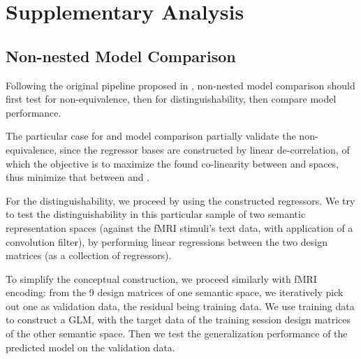 \section{Supplementary Analysis}
\subsection{Non-nested Model Comparison} 
\label{appsubsec:nonnestedcompmeth}
Following the original pipeline proposed in \cite{merkleTestingNonnestedStructural2016}, non-nested model comparison should first test for non-equivalence, then for distinguishability, then compare model performance. 

The particular case for  and  model comparison partially validate the non-equivalence, since the regressor bases are constructed by linear de-correlation, of which the objective is to maximize the found co-linearity between  and  spaces, thus minimize that between  and .

For the distinguishability, we proceed by using the constructed regressors. We try to test the distinguishability in this particular sample of two semantic representation spaces (against the fMRI stimuli's text data, with application of a convolution filter), by performing linear regressions between the two design matrices (as a collection of regressors). 

To simplify the conceptual construction, we proceed similarly with fMRI encoding: from the 9 design matrices of one semantic space, we iteratively pick out one as validation data, the residual being training data. We use training data to construct a GLM, with the target data of the training session design matrices of the other semantic space. Then we test the generalization performance of the predicted model on the validation data. 